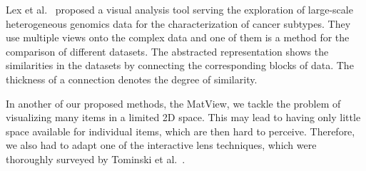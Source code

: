 \documentclass{bmcart}
\begin{document}

Lex et al.~\cite{Lex2012} proposed a visual analysis tool serving the exploration of large-scale heterogeneous genomics data for the characterization of cancer subtypes.
They use multiple views onto the complex data and one of them is a method for the comparison of different datasets.
The abstracted representation shows the similarities in the datasets by connecting the corresponding blocks of data. 
The thickness of a connection denotes the degree of similarity.

In another of our proposed methods, the MatView, we tackle the problem of visualizing many items in a limited 2D space.
This may lead to having only little space available for individual items, which are then hard to perceive.
Therefore, we also had to adapt one of the interactive lens techniques, which were thoroughly surveyed by Tominski et al.~\cite{Tominski2014}.
\end{document}
